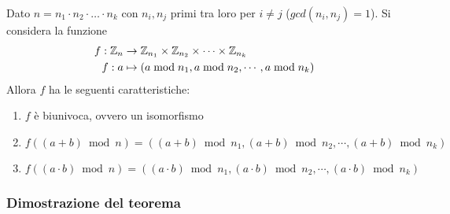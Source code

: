 \begin{theorem}
    \label{teo:cinese_resti}
    Dato $n = 
        n_1 \cdot
        n_2 \cdot
        \ldots
        \cdot
        n_k
    $ con $
        n_i, n_j
    $ primi tra loro per $i \ne j$ ($
        gcd(
            n_i, n_j
        ) = 1
    $).
    Si considera la funzione
    \begin{align*}
        f
        :
        \mathbb{Z}_{n} 
        &
        \to
        \mathbb{Z}_{n_1} \times
        \mathbb{Z}_{n_2} \times
        \cdots
        \times
        \mathbb{Z}_{n_k}
        \\
        f
        :
        a
        &
        \mapsto
        \left( 
            a \bmod n_1,
            a \bmod n_2,
            \cdots,
            a \bmod n_k
        \right)
    \end{align*}
    Allora $f$ ha le seguenti caratteristiche:
    \begin{enumerate}
        \item $f$ è biunivoca, ovvero un isomorfismo
        \item $f
            \left( 
                \left( a+b \right) \bmod n 
            \right)
            =
            \left( 
                \left( a+b \right) \bmod n_1,
                \left( a+b \right) \bmod n_2,
                \cdots,
                \left( a+b \right) \bmod n_k
            \right)
            $
        \item $f
            \left( 
                \left( a \cdot b \right) \bmod n 
            \right)
            =
            \left( 
                \left( a \cdot b \right) \bmod n_1,
                \left( a \cdot b \right) \bmod n_2,
                \cdots,
                \left( a \cdot b \right) \bmod n_k
            \right)
            $
    \end{enumerate}
\end{theorem}

\subsubsection{Dimostrazione del teorema}

